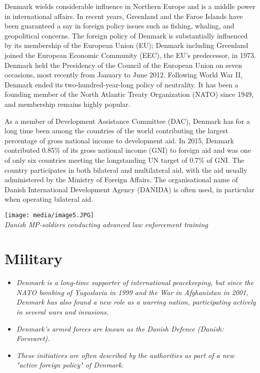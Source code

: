 Denmark wields considerable influence in Northern Europe and is a middle
power in international affairs. In recent years, Greenland and the Faroe
Islands have been guaranteed a say in foreign policy issues such as
fishing, whaling, and geopolitical concerns. The foreign policy of
Denmark is substantially influenced by its membership of the European
Union (EU); Denmark including Greenland joined the European Economic
Community (EEC), the EU's predecessor, in 1973. Denmark held the
Presidency of the Council of the European Union on seven occasions, most
recently from January to June 2012. Following World War II, Denmark
ended its two-hundred-year-long policy of neutrality. It has been a
founding member of the North Atlantic Treaty Organization (NATO) since
1949, and membership remains highly popular.

As a member of Development Assistance Committee (DAC), Denmark has for a
long time been among the countries of the world contributing the largest
percentage of gross national income to development aid. In 2015, Denmark
contributed 0.85\% of its gross national income (GNI) to foreign aid and
was one of only six countries meeting the longstanding UN target of
0.7\% of GNI. The country participates in both bilateral and
multilateral aid, with the aid usually administered by the Ministry of
Foreign Affairs. The organisational name of Danish International
Development Agency (DANIDA) is often used, in particular when operating
bilateral aid.

\texttt{[image: media/image5.JPG]}\\
\emph{Danish MP-soldiers conducting advanced law enforcement training}

\section{Military}\label{military}

\begin{itemize}
\item
  \emph{Denmark is a long-time supporter of international peacekeeping,
  but since the NATO bombing of Yugoslavia in 1999 and the War in
  Afghanistan in 2001, Denmark has also found a new role as a warring
  nation, participating actively in several wars and invasions.}
\item
  \emph{Denmark's armed forces are known as the Danish Defence (Danish:
  Forsvaret).}
\item
  \emph{These initiatives are often described by the authorities as part
  of a new "active foreign policy" of Denmark.}
\end{itemize}

